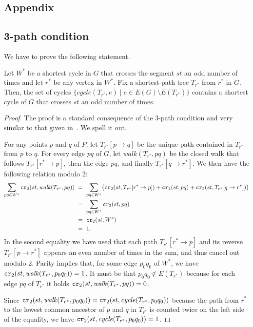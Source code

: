 \documentclass[a4paper,USenglish]{lipics}
\newcommand{\cycle}{\mathit{cycle}}
\newcommand{\walk}{\mathit{walk}}
\newcommand\CR{\mbox{\tt cr}_2}		  %
\begin{document}
\newpage
\begin{appendix}
\section{Appendix}
\label{appendix}

\subsection{3-path condition}
\label{sec:3-path-condition}
We have to prove the following statement.

\begin{lemma}
	Let $W^*$ be a shortest cycle in $G$ that crosses the segment 
	$st$ an odd number of times and let $r^*$ be any vertex in $W^*$.
	Fix a shortest-path tree $T_{r^*}$ from $r^*$ in $G$.
	Then, the set of cycles $\{ \cycle(T_{r^*},e)\mid e\in E(G)\setminus E(T_{r^*})\}$
	contains a shortest cycle of $G$ that crosses $st$ an odd number of times.
\end{lemma}
\begin{proof}
	The proof is a standard consequence of the 3-path condition and 
	very similar to that given in~\cite{CG16}. We spell it out.
	
	For any points $p$ and $q$ of $P$, let $T_{r^*}[p \rightarrow q]$ be the 
	unique path contained in $T_{r^*}$ from $p$ to $q$.
	For every edge $pq$ of $G$, let $\walk(T_{r^*},pq)$ be the closed walk that follows 
	$T_{r^*}[r^*\rightarrow p]$, then the edge $pq$, and finally $T_{r^*}[q\rightarrow r^*]$.
	We then have the following relation modulo 2:
	\begin{align*}
		\sum_{pq\in W^*} \CR(st,\walk(T_{r^*},pq)) ~&=~ 
		\sum_{pq\in W^*} \bigl( \CR(st,T_{r^*}[r^* \rightarrow p])+ \CR(st,pq) + 
						\CR(st,T_{r^*}[q \rightarrow r^*]) \bigr) \\
		&=~ \sum_{pq\in W^*} \CR(st,pq)  \\
		&=~ \CR(st,W^*) \\
		&=~ 1. 		
	\end{align*}
	In the second equality we have used that each path
	$T_{r^*}[r^*\rightarrow p]$ and its reverse $T_{r^*}[p\rightarrow r^*]$ 
	appears an even number of times in the sum,
	and thus cancel out modulo 2.
	Parity implies that, for some edge $p_0q_0$ of $W^*$, 
	we have $\CR(st,\walk(T_{r^*},p_0q_0))=1$.
	It must be that $p_0q_0\notin E(T_{r^*})$ because for each edge $pq$ of $T_{r^*}$
	it holds $\CR(st,\walk(T_{r^*},pq))=0$.
	
	Since $\CR(st,\walk(T_{r^*},p_0q_0))= \CR(st,\cycle(T_{r^*},p_0q_0))$ 
	because the path from $r^*$ to the lowest common ancestor of $p$ and $q$ in $T_{r^*}$ 
	is counted twice on the left side of the equality, 
	we have $\CR(st,\cycle(T_{r^*},p_0q_0))=1$. 


\end{proof}
\end{appendix}
\end{document}
